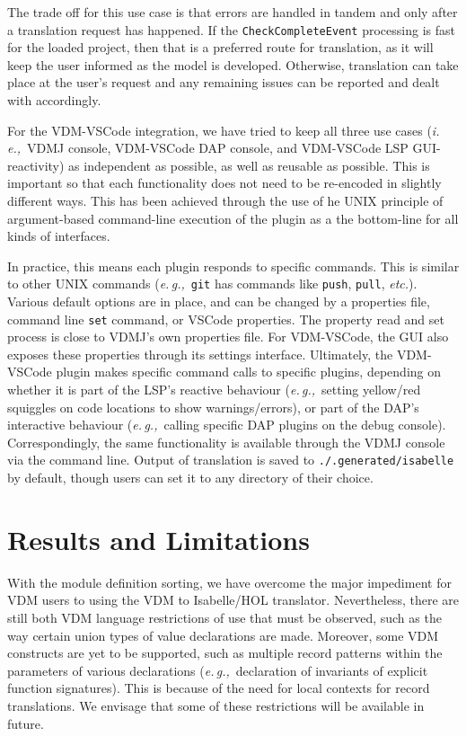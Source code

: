 \documentclass[runningheads,a4paper]{llncs}
\newcommand{\eg}{{\em e.\,g.,\/}}
\newcommand{\ie}{{\em i.\,e.,\/}}
\newcommand{\etc}{{\em etc.\/}}
\begin{document}
The trade off for this use case is that errors are handled in tandem and only after a translation request has happened. If the \texttt{CheckCompleteEvent} processing is fast for the loaded project, then that is a preferred route for translation, as it will keep the user informed as the model is developed. Otherwise, translation can take place at the user's request and any remaining issues can be reported and dealt with accordingly.  

For the VDM-VSCode integration, we have tried to keep all three use cases (\ie~VDMJ console, VDM-VSCode DAP console, and VDM-VSCode LSP GUI-reactivity) as independent as possible, as well as reusable as possible. This is important so that each functionality does not need to be re-encoded in slightly different ways. This has been achieved through the use of he UNIX principle of argument-based command-line execution of the plugin as a the bottom-line for all kinds of interfaces. 

In practice, this means each plugin responds to specific commands. This is similar to other UNIX commands (\eg~\texttt{git} has commands like \texttt{push}, \texttt{pull}, \etc). Various default options are in place, and can be changed by a properties file, command line \texttt{set} command, or VSCode properties. The property read and set process is close to VDMJ's own properties file. For VDM-VSCode, the GUI also exposes these properties through its settings interface. Ultimately, the VDM-VSCode plugin makes specific command calls to specific plugins, depending on whether it is part of the LSP's reactive behaviour  (\eg~setting yellow/red squiggles on code locations to show warnings/errors), or part of the DAP's interactive behaviour (\eg~calling specific DAP plugins on the debug console). Correspondingly, the same functionality is available through the VDMJ console via the command line. Output of translation is saved to \texttt{./.generated/isabelle} by default, though users can set it to any directory of their choice. 

\section{Results and Limitations}\label{sec:Examples}

With the module definition sorting, we have overcome the major impediment for VDM users to using the VDM to Isabelle/HOL translator. Nevertheless, there are still both VDM language restrictions of use that must be observed, such as the way certain union types of value declarations are made. Moreover, some VDM constructs are yet to be supported, such as multiple record patterns within the parameters of various declarations (\eg~declaration of invariants of explicit function signatures). This is because of the need for local contexts for record translations. We envisage that some of these restrictions will be available in future. 
\end{document}

